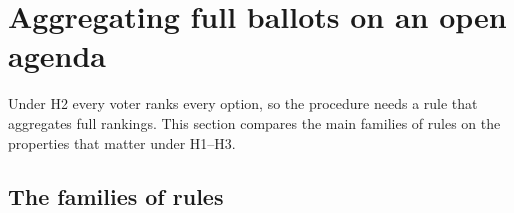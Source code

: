 \section{Aggregating full ballots on an open agenda}\label{sec:aggregation}

Under H2 every voter ranks every option, so the procedure needs a rule that aggregates full rankings. This
section compares the main families of rules on the properties that matter under H1--H3.

\subsection{The families of rules}

